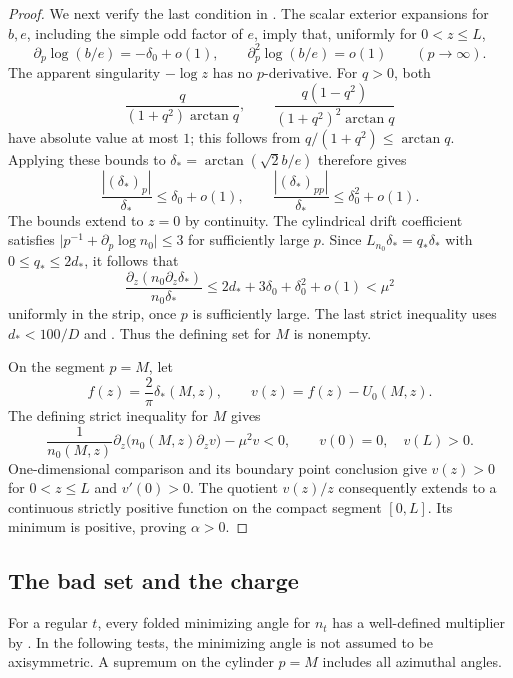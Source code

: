 \begin{proof}
We next verify the last condition in
.  The scalar exterior expansions for
\(b,e\), including the simple odd factor of \(e\), imply that,
uniformly for \(0<z\le L\),
\[
 \partial_p\log(b/e)=-\delta_0+o(1),\qquad
 \partial_p^2\log(b/e)=o(1)\qquad(p\to\infty).
\]
The apparent singularity \(-\log z\) has no \(p\)-derivative.
For \(q>0\), both
\[
 \frac{q}{(1+q^2)\arctan q},
 \qquad
 \frac{q(1-q^2)}{(1+q^2)^2\arctan q}
\]
have absolute value at most \(1\); this follows from
\(q/(1+q^2)\le\arctan q\).
Applying these bounds to \(\delta_*=\arctan(\sqrt2 b/e)\)
therefore gives
\[
 \frac{|(\delta_*)_p|}{\delta_*}\le\delta_0+o(1),\qquad
 \frac{|(\delta_*)_{pp}|}{\delta_*}\le\delta_0^2+o(1).
\]
The bounds extend to \(z=0\) by continuity.  The cylindrical drift
coefficient satisfies \(\lvert p^{-1}+\partial_p\log n_0\rvert\le3\)
for sufficiently large \(p\).  Since
\(L_{n_0}\delta_*=q_*\delta_*\) with
\(0\le q_*\le2d_*\), it follows that
\[
 \frac{\partial_z(n_0\partial_z\delta_*)}{n_0\delta_*}
 \le 2d_*+3\delta_0+\delta_0^2+o(1)<\mu^2
\]
uniformly in the strip, once \(p\) is sufficiently large.
The last strict inequality uses
\(d_*<100/D\) and .
Thus the defining set for \(M\) is nonempty.

On the segment \(p=M\), let
\[
 f(z)=\frac2\pi\delta_*(M,z),\qquad
 v(z)=f(z)-U_0(M,z).
\]
The defining strict inequality for \(M\) gives
\[
 \frac1{n_0(M,z)}
 \partial_z\bigl(n_0(M,z)\partial_zv\bigr)-\mu^2v<0,
 \qquad
 v(0)=0,\quad v(L)>0.
\]
One-dimensional comparison and its boundary point conclusion
give \(v(z)>0\) for \(0<z\le L\) and \(v'(0)>0\).
The quotient \(v(z)/z\) consequently extends to a continuous
strictly positive function on the compact segment \([0,L]\).
Its minimum is positive, proving \(\alpha>0\).
\end{proof}

\subsection{The bad set and the charge}

For a regular \(t\), every folded minimizing angle for \(n_t\)
has a well-defined multiplier by .
In the following tests, the minimizing angle is not assumed to be
axisymmetric.  A supremum on the cylinder \(p=M\) includes all
azimuthal angles.

